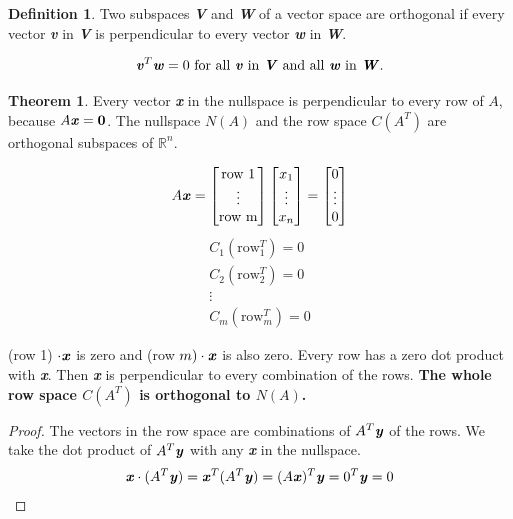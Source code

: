 \documentclass[12pt, letterpaper]{article}
\newcommand{\R}[1]{$\mathbb{R}^{#1}$}
\newcommand{\V}[1]{\textbf{\textit{#1}}}
\newcommand{\DefinitionSpace}{\vspace{15px}}
\theoremstyle{definition}
\newtheorem{definition}{Definition}[section]
\newtheorem{theorem}{Theorem}
\begin{document}
	\begin{definition}
		Two subspaces \V{V} and \V{W} of a vector space are orthogonal if every vector \V{v} in \V{V} is perpendicular to every vector \V{w} in \V{W}.
		\renewcommand{\theenumi}{\roman{enumi}}
		
		\begin{equation*}
			\V{v}^T \V{w} = 0 \text{ for all \V{v} in \V{V} and all \V{w} in \V{W}.}
		\end{equation*}
	\end{definition} 	
	\DefinitionSpace
	
	
	\begin{theorem}
	Every vector \V{x} in the nullspace is perpendicular to every row of $A$, because $A\V{x} = \textbf{0}$. The nullspace $N(A)$ and the row space $C(A^T)$ are orthogonal subspaces of \R{n}.
	
		\begin{equation*}
			A \V{x} = \begin{bmatrix} \text{row 1} \\ \vdots \\ \text{row m} \end{bmatrix} \begin{bmatrix} x_1 \\ \vdots \\ x_n \end{bmatrix} = \begin{bmatrix} 0 \\ \vdots \\ 0 \end{bmatrix}
		\end{equation*}
		\begin{gather*}
			C_1(\text{row}_1^T) = 0 \\
			C_2(\text{row}_2^T) = 0 \\
			\vdots \\
			C_m(\text{row}_m^T) = 0
		\end{gather*}
	\end{theorem}
	\noindent (row 1) $\cdot \V{x}$ is zero and (row $m) \cdot \V{x}$ is also zero. Every row has a zero dot product with \V{x}. Then \V{x} is perpendicular to every combination of the rows. \textbf{The whole row space $C(A^T)$ is orthogonal to $N(A)$. }
	\DefinitionSpace
	
	
	\begin{proof}
		The vectors in the row space are combinations of $A^T \V{y}$ of the rows. We take the dot product of $A^T \V{y}$ with any \V{x} in the nullspace.
			\begin{gather*}
				\V{x} \cdot (A^T \V{y}) = \V{x}^T (A^T \V{y}) = (A\V{x})^T \V{y} = 0^T \V{y} = 0
			\end{gather*}
	\end{proof}
	\DefinitionSpace
	
\end{document}
